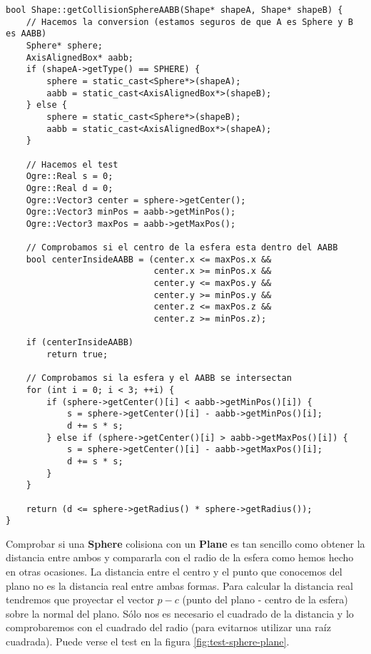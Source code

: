 \begin{lstlisting}[style=C++]
bool Shape::getCollisionSphereAABB(Shape* shapeA, Shape* shapeB) {
    // Hacemos la conversion (estamos seguros de que A es Sphere y B es AABB)
    Sphere* sphere;
    AxisAlignedBox* aabb;
    if (shapeA->getType() == SPHERE) {
        sphere = static_cast<Sphere*>(shapeA);
        aabb = static_cast<AxisAlignedBox*>(shapeB);
    } else {
        sphere = static_cast<Sphere*>(shapeB);
        aabb = static_cast<AxisAlignedBox*>(shapeA);
    }

    // Hacemos el test
    Ogre::Real s = 0;
    Ogre::Real d = 0;
    Ogre::Vector3 center = sphere->getCenter();
    Ogre::Vector3 minPos = aabb->getMinPos();
    Ogre::Vector3 maxPos = aabb->getMaxPos();

    // Comprobamos si el centro de la esfera esta dentro del AABB
    bool centerInsideAABB = (center.x <= maxPos.x &&
                             center.x >= minPos.x &&
                             center.y <= maxPos.y &&
                             center.y >= minPos.y &&
                             center.z <= maxPos.z &&
                             center.z >= minPos.z);

    if (centerInsideAABB)
        return true;

    // Comprobamos si la esfera y el AABB se intersectan
    for (int i = 0; i < 3; ++i) {
        if (sphere->getCenter()[i] < aabb->getMinPos()[i]) {
            s = sphere->getCenter()[i] - aabb->getMinPos()[i];
            d += s * s;
        } else if (sphere->getCenter()[i] > aabb->getMaxPos()[i]) {
            s = sphere->getCenter()[i] - aabb->getMaxPos()[i];
            d += s * s;
        }
    }

    return (d <= sphere->getRadius() * sphere->getRadius());
}
\end{lstlisting}

Comprobar si una \textbf{Sphere} colisiona con un \textbf{Plane} es tan
sencillo como obtener la distancia entre ambos y compararla con el radio
de la esfera como hemos hecho en otras ocasiones. La distancia entre el
centro y el punto que conocemos del plano no es la distancia real entre
ambas formas. Para calcular la distancia real tendremos que proyectar
el vector $p-c$ (punto del plano - centro de la esfera) sobre la normal
del plano. Sólo nos es necesario el cuadrado de la distancia y lo
comprobaremos con el cuadrado del radio (para evitarnos utilizar una
raíz cuadrada). Puede verse el test en la figura \ref{fig:test-sphere-plane}.\\


